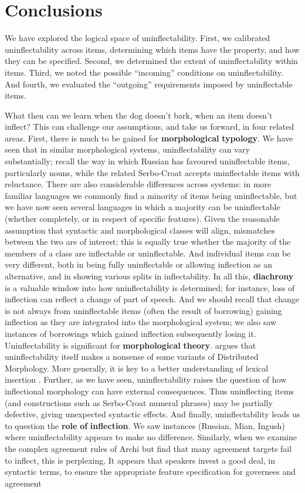 \documentclass[output=paper]{langscibook}
\begin{document}
\section{\textbf{Conclusions}}

We have explored the logical space of uninflectability. First, we calibrated uninflectability across items, determining which items have the property, and how they can be specified. Second, we determined the extent of uninflectability within items. Third, we noted the possible “incoming” conditions on uninflectability. And fourth, we evaluated the “outgoing” requirements imposed by uninflectable items. 

What then can we learn when the dog doesn’t bark, when an item doesn’t inflect? This can challenge our assumptions, and take us forward, in four related areas. First, there is much to be gained for \textbf{morphological} \textbf{typology}. We have seen that in similar morphological systems, uninflectability can vary substantially; recall the way in which Russian has favoured uninflectable items, particularly nouns, while the related Serbo-Croat accepts uninflectable items with reluctance. There are also considerable differences across systems: in more familiar languages we commonly find a minority of items being uninflectable, but we have now seen several languages in which a majority can be uninflectable (whether completely, or in respect of specific features). Given the reasonable assumption that syntactic and morphological classes will align, mismatches between the two are of interest; this is equally true whether the majority of the members of a class are inflectable or uninflectable. And individual items can be very different, both in being fully uninflectable or allowing inflection as an alternative, and in showing various splits in inflectability. In all this, \textbf{diachrony} is a valuable window into how uninflectability is determined; for instance, loss of inflection can reflect a change of part of speech. And we should recall that change is not always from uninflectable items (often the result of borrowing) gaining inflection as they are integrated into the morphological system; we also saw instances of borrowings which gained inflection subsequently losing it. Uninflectability is significant for \textbf{morphological} \textbf{theory}. \citet[143]{Spencer2020} argues that uninflectability itself makes a nonsense of some variants of Distributed Morphology. More generally, it is key to a better understanding of lexical insertion \citep{Spencer2025}. Further, as we have seen, uninflectability raises the question of how inflectional morphology can have external consequences. Thus uninflecting items (and constructions such as Serbo-Croat numeral phrases) may be partially defective, giving unexpected syntactic effects. And finally, uninflectability leads us to question the \textbf{role} \textbf{of} \textbf{inflection}. We saw instances (Russian, Mian, Ingush) where uninflectability appears to make no difference. Similarly, when we examine the complex agreement rules of Archi but find that many agreement targets fail to inflect, this is perplexing. It appears that speakers invest a good deal, in syntactic terms, to ensure the appropriate feature specification for governees and agreement 
\end{document}
